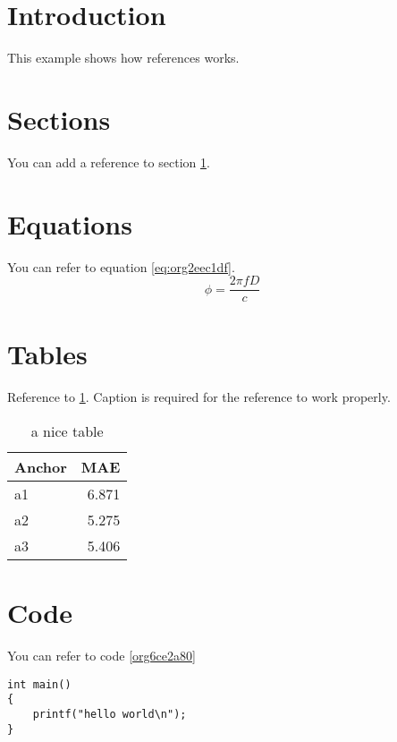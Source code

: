 


\section{Introduction}
\label{sec:org4cd2fd9}
This example shows how references works.

\section{Sections}
\label{sec:orge284a21}
You can add a reference to section \ref{sec:org4cd2fd9}.

\section{Equations}
\label{sec:org6a35058}
You can refer to equation \ref{eq:org2eec1df}.
\begin{equation}
\label{eq:org2eec1df}
\phi = \frac{2\pi fD}{c}
\end{equation}

\section{Tables}
\label{sec:org96d021f}
Reference to \ref{tab:orgcf55511}.
Caption is required for the reference to work properly.

\begin{table}[htbp]
\caption{\label{tab:orgcf55511}
a nice table}
\centering
\begin{tabular}{lr}
Anchor & MAE\\
\hline
a1 & 6.871\\
a2 & 5.275\\
a3 & 5.406\\
\end{tabular}
\end{table}

\section{Code}
\label{sec:org0c77248}
You can refer to code \ref{org6ce2a80}

\begin{verbatim}
int main()
{
    printf("hello world\n");
}
\end{verbatim}



